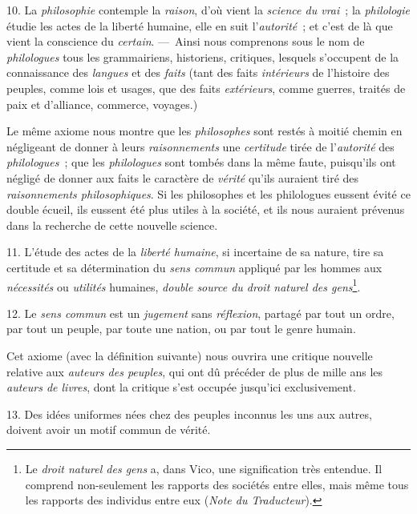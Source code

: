 \documentclass[french,twoside]{book} %
\begin{document}
10. La {\itshape philosophie} contemple la {\itshape raison}, d’où vient la {\itshape science du vrai} ; la {\itshape philologie} étudie les actes de la liberté humaine, elle en suit l’{\itshape autorité} ; et c’est de là que vient la conscience du {\itshape certain}. — Ainsi nous comprenons sous le nom de {\itshape philologues} tous les grammairiens, historiens, critiques, lesquels s’occupent de la connaissance des {\itshape langues} et des {\itshape faits} (tant des faits {\itshape intérieurs} de l’histoire des peuples, comme lois et usages, que des faits {\itshape extérieurs},  comme guerres, traités de paix et d’alliance, commerce, voyages.)\par
Le même axiome nous montre que les {\itshape philosophes} sont restés à moitié chemin en négligeant de donner à leurs {\itshape raisonnements} une {\itshape certitude} tirée de l’{\itshape autorité} des {\itshape philologues} ; que les {\itshape philologues} sont tombés dans la même faute, puisqu’ils ont négligé de donner aux faits le caractère de {\itshape vérité} qu’ils auraient tiré des {\itshape raisonnements philosophiques}. Si les philosophes et les philologues eussent évité ce double écueil, ils eussent été plus utiles à la société, et ils nous auraient prévenus dans la recherche de cette nouvelle science.\par
11. L’étude des actes de la {\itshape liberté humaine}, si incertaine de sa nature, tire sa certitude et sa détermination du {\itshape sens commun} appliqué par les hommes aux {\itshape nécessités} ou {\itshape utilités} humaines, {\itshape double source du droit naturel des gens}\footnote{Le {\itshape droit naturel des gens} a, dans Vico, une signification très entendue. Il comprend non-seulement les rapports des sociétés entre elles, mais même tous les rapports des individus entre eux ({\itshape Note du Traducteur}).}.\par
12. Le {\itshape sens commun} est un {\itshape jugement} sans {\itshape réflexion}, partagé par tout un ordre, par tout un peuple, par toute une nation, ou par tout le genre humain.\par
Cet axiome (avec la définition suivante) nous ouvrira  une critique nouvelle relative aux {\itshape auteurs des peuples}, qui ont dû précéder de plus de mille ans les {\itshape auteurs de livres}, dont la critique s’est occupée jusqu’ici exclusivement.\par
13. Des idées uniformes nées chez des peuples inconnus les uns aux autres, doivent avoir un motif commun de vérité.\par
\end{document}
